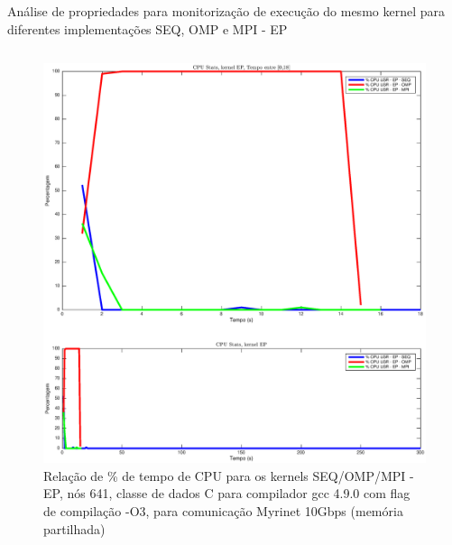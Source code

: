 \documentclass{beamer}
\begin{document}
\begin{frame}{ \tiny Análise de propriedades para monitorização de execução do mesmo kernel para diferentes implementações SEQ, OMP e MPI - EP}


\begin{columns}[t]
\centering



\begin{figure}[H]
\centering
\includegraphics[width=0.9\columnwidth]{EPS/dstat_EP_seq_vs_omp_vs_mpi/cpu.eps}
\caption{\tiny Relação de \% de tempo de CPU para os kernels SEQ/OMP/MPI - EP, nós 641, classe de dados C para compilador gcc 4.9.0 com flag de compilação  -O3, para comunicação Myrinet 10Gbps (memória partilhada)}
\label{dstat_ep_SOM_cpu}
\end{figure}

\centering






\end{columns}
\end{frame}
\end{document}
